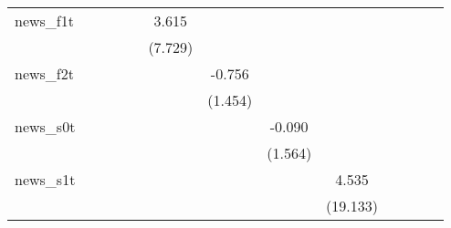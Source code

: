 {\begin{tabular}{l*{12}{c}}
\addlinespace
news\_f1t    &                     &                     &                     &                     &       3.615         &                     &                     &                     &                     &                     &                     &                     \\
            &                     &                     &                     &                     &     (7.729)         &                     &                     &                     &                     &                     &                     &                     \\
\addlinespace
news\_f2t    &                     &                     &                     &                     &                     &      -0.756         &                     &                     &                     &                     &                     &                     \\
            &                     &                     &                     &                     &                     &     (1.454)         &                     &                     &                     &                     &                     &                     \\
\addlinespace
news\_s0t    &                     &                     &                     &                     &                     &                     &      -0.090         &                     &                     &                     &                     &                     \\
            &                     &                     &                     &                     &                     &                     &     (1.564)         &                     &                     &                     &                     &                     \\
\addlinespace
news\_s1t    &                     &                     &                     &                     &                     &                     &                     &       4.535         &                     &                     &                     &                     \\
            &                     &                     &                     &                     &                     &                     &                     &    (19.133)         &                     &                     &                     &                     \\

\end{tabular}}
